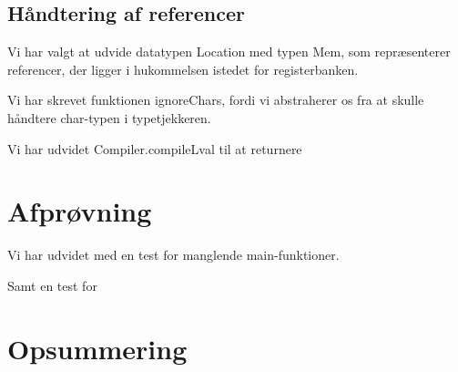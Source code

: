 \documentclass[10pt,a4paper,danish]{article}
\begin{document}
\subsection{Håndtering af referencer}
Vi har valgt at udvide datatypen Location med typen Mem, som repræsenterer
referencer, der ligger i hukommelsen istedet for registerbanken. 

Vi har skrevet funktionen ignoreChars, fordi vi abstraherer os fra at skulle 
håndtere char-typen i typetjekkeren.    
 
Vi har udvidet Compiler.compileLval til at returnere 

\section{Afprøvning}
Vi har udvidet med en test for manglende main-funktioner. 

Samt en test for 

\section{Opsummering}
\end{document}
